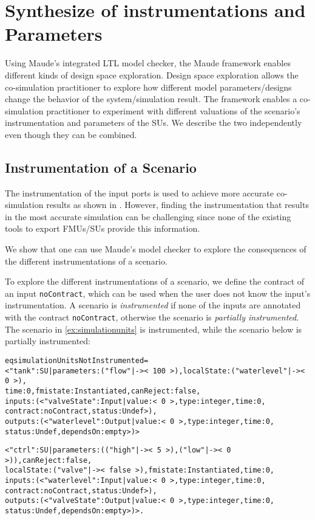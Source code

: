 
\section{Synthesize of instrumentations and Parameters}\label{sc:DSE}
Using Maude's integrated LTL model checker, the Maude framework enables different kinds of design space exploration.
Design space exploration allows the co-simulation practitioner to explore how different model parameters/designs change the behavior of the system/simulation result.
The framework enables a co-simulation practitioner to experiment with different valuations of the scenario's instrumentation and parameters of the SUs.
We describe the two independently even though they can be combined.


\subsection{Instrumentation of a Scenario}
The instrumentation of the input ports is used to achieve more accurate co-simulation results as shown in \cite{Gomes2019,Oakes2021,hansen_verification_2021}.
However, finding the instrumentation that results in the most accurate simulation can be challenging since none of the existing tools to export FMUs/SUs provide this information.

We show that one can use Maude's model checker to explore the consequences of the different instrumentations of a scenario.

To explore the different instrumentations of a scenario, we define the contract of an input \texttt{noContract}, which can be used when the user does not know the input's instrumentation.
A scenario is \emph{instrumented} if none of the inputs are annotated with the contract \texttt{noContract}, otherwise the scenario is \emph{partially instrumented}.
The scenario in \cref{ex:simulationunits} is instrumented, while the scenario below is partially instrumented:
\scriptsize
\begin{alltt}
eq simulationUnitsNotInstrumented = 
< "tank" : SU | parameters : ("flow" |-> <\,100\,>),  localState : ("waterlevel" |-> <\,0\,>),
                time : 0,  fmistate : Instantiated, canReject : false, 
                inputs : (< "valveState" : Input | value : <\,0\,>, type : integer, time : 0,
                                                    contract : noContract, status : Undef >), 
                outputs : (< "waterlevel" : Output | value : <\,0\,>, type : integer, time : 0,
                                                      status : Undef, dependsOn : empty >) >

< "ctrl" : SU | parameters : (("high" |-> <\,5\,>) , ("low" |-> <\,0\,>)), canReject : false, 
                localState : ("valve" |-> <\,false\,>), fmistate : Instantiated, time : 0, 
                inputs : (< "waterlevel" : Input | value : <\,0\,>, type : integer, time : 0,
                                                    contract : noContract, status : Undef >), 
                outputs : (< "valveState" : Output | value : <\,0\,>, type : integer, time : 0,
                                                      status : Undef, dependsOn : empty >) > . 

\end{alltt}
\normalsize


